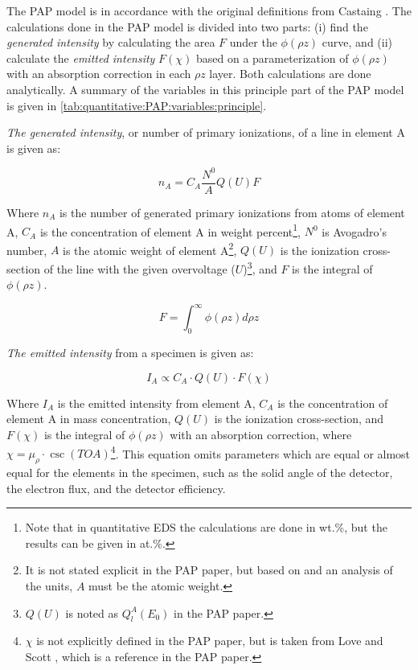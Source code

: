 The PAP model is in accordance with the original definitions from Castaing \cite{castaing_1951}.
The calculations done in the PAP model is divided into two parts: (i) find the \emph{generated intensity} by calculating the area $F$ under the $\phi(\rho z)$ curve, and (ii) calculate the \emph{emitted intensity} $F(\chi)$ based on a parameterization of $\phi(\rho z)$ with an absorption correction in each $\rho z$ layer.
Both calculations are done analytically.
A summary of the variables in this principle part of the PAP model is given in \cref{tab:quantitative:PAP:variables:principle}.


\emph{The generated intensity}, or number of primary ionizations, of a line in element A is given as: 

\begin{equation}
    \label{eq:theory:quantitative:pap:general_principle:n_a}
    n_A = C_A \frac{N^0}{A} Q(U) F
\end{equation}

Where $n_A$ is the number of generated primary ionizations from atoms of element A, $C_A$ is the concentration of element A in weight percent\footnote{Note that in quantitative EDS the calculations are done in wt.\%, but the results can be given in at.\%.}, $N^0$ is Avogadro's number, $A$ is the atomic weight of element A\footnote{It is not stated explicit in the PAP paper, but based on \cite{love_scott_1990} and an analysis of the units, $A$ must be the atomic weight.}, $Q(U)$ is the ionization cross-section of the line with the given overvoltage ($U$)\footnote{$Q(U)$ is noted as $Q_l^A(E_0)$ in the PAP paper.}, and $F$ is the integral of $\phi(\rho z)$.

\begin{equation}
    \label{eq:theory:quantitative:pap:general_principle:F}
    F = \int_0^\infty \phi(\rho z) d\rho z
\end{equation}


\emph{The emitted intensity} from a specimen is given as:

\begin{equation}
    \label{eq:theory:quantitative:pap:general_principle:I_A}
    I_A \propto C_A \cdot Q(U) \cdot F(\chi)
\end{equation}

Where $I_A$ is the emitted intensity from element A, $C_A$ is the concentration of element A in mass concentration, $Q(U)$ is the ionization cross-section, and $F(\chi)$ is the integral of $\phi(\rho z)$ with an absorption correction, where $ \chi = \mu_\rho \cdot \csc(TOA)$\footnote{$\chi$ is not explicitly defined in the PAP paper, but is taken from Love and Scott \cite[Eq. (1)]{love_scott_1990}, which is a reference in the PAP paper.}.
This equation omits parameters which are equal or almost equal for the elements in the specimen, such as the solid angle of the detector, the electron flux, and the detector efficiency.


